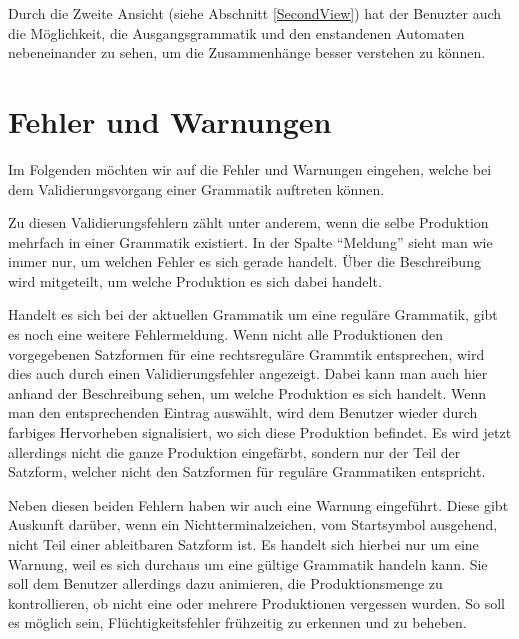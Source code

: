 Durch die Zweite Ansicht (siehe Abschnitt \ref{SecondView}) hat der Benuzter
auch die Möglichkeit, die Ausgangsgrammatik und den enstandenen Automaten
nebeneinander zu sehen, um die Zusammenhänge besser verstehen zu können.\vspace{10pt}


\section{Fehler und Warnungen}\label{InteractionGrammar}

Im Folgenden möchten wir auf die Fehler und Warnungen eingehen, welche bei dem
Validierungsvorgang einer Grammatik auftreten können.\vspace{10pt}

Zu diesen Validierungsfehlern zählt unter anderem, wenn die selbe Produktion
mehrfach in einer Grammatik existiert. In der Spalte "`Meldung"' sieht man wie
immer nur, um welchen Fehler es sich gerade handelt. Über die Beschreibung wird
mitgeteilt, um welche Produktion es sich dabei handelt.\vspace{10pt}

Handelt es sich bei der aktuellen Grammatik um eine reguläre Grammatik, gibt es
noch eine weitere Fehlermeldung. Wenn nicht alle Produktionen den vorgegebenen
Satzformen für eine rechtsreguläre Grammtik entsprechen, wird dies auch durch
einen Validierungsfehler angezeigt. Dabei kann man auch hier anhand der
Beschreibung sehen, um welche Produktion es sich handelt. Wenn man den
entsprechenden Eintrag auswählt, wird dem Benutzer wieder durch farbiges
Hervorheben signalisiert, wo sich diese Produktion befindet. Es wird jetzt
allerdings nicht die ganze Produktion eingefärbt, sondern nur der Teil der
Satzform, welcher nicht den Satzformen für reguläre Grammatiken entspricht.\vspace{10pt}

Neben diesen beiden Fehlern haben wir auch eine Warnung eingeführt. Diese gibt
Auskunft darüber, wenn ein Nichtterminalzeichen, vom Startsymbol ausgehend, nicht
Teil einer ableitbaren Satzform ist. Es handelt sich hierbei nur um eine Warnung,
weil es sich durchaus um eine gültige Grammatik handeln kann. Sie soll dem
Benutzer allerdings dazu animieren, die Produktionsmenge zu kontrollieren, ob
nicht eine oder mehrere Produktionen vergessen wurden. So soll es möglich sein,
Flüchtig\-keits\-fehler frühzeitig zu erkennen und zu beheben.\vspace{10pt}


